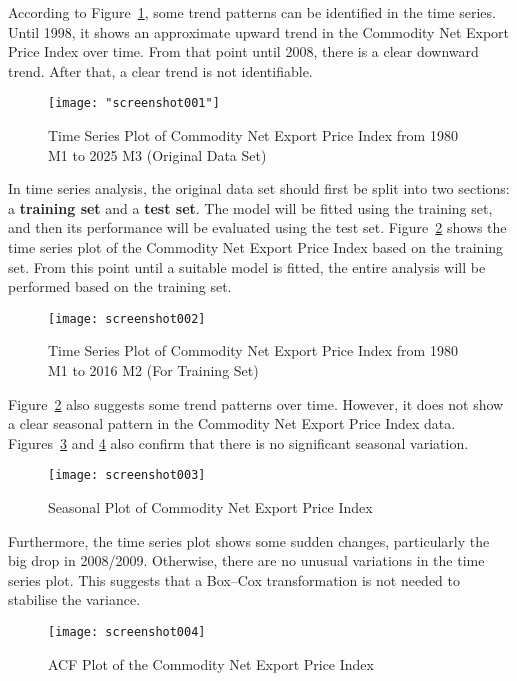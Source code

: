 \documentclass[12pt,a4paper]{report} %
\begin{document}
	According to Figure~\ref{fig:screenshot001}, some trend patterns can be identified in the time series. Until 1998, it shows an approximate upward trend in the Commodity Net Export Price Index over time. From that point until 2008, there is a clear downward trend. After that, a clear trend is not identifiable.
	
	
	\begin{figure}[h!]
		\centering
		\texttt{[image: "screenshot001"]}
		\caption{Time Series Plot of Commodity Net Export Price Index from 1980 M1 to 2025 M3 (Original Data Set)}
		\label{fig:screenshot001}
	\end{figure}
	
	
	In time series analysis, the original data set should first be split into two sections: a \textbf{training set} and a \textbf{test set}. The model will be fitted using the training set, and then its performance will be evaluated using the test set. Figure~\ref{fig:screenshot002} shows the time series plot of the Commodity Net Export Price Index based on the training set. From this point until a suitable model is fitted, the entire analysis will be performed based on the training set.
	
	
	\begin{figure}[h!]
		\centering
		\texttt{[image: screenshot002]}
		\caption{Time Series Plot of Commodity Net Export Price Index from 1980 M1 to 2016 M2 (For Training Set)}
		\label{fig:screenshot002}
	\end{figure}
	
	
	Figure~\ref{fig:screenshot002} also suggests some trend patterns over time. However, it does not show a clear seasonal pattern in the Commodity Net Export Price Index data. Figures~\ref{fig:screenshot003} and \ref{fig:screenshot004} also confirm that there is no significant seasonal variation.
	
	
	\begin{figure}[h!]
		\centering
		\texttt{[image: screenshot003]}
		\caption{Seasonal Plot of Commodity Net Export Price Index}
		\label{fig:screenshot003}
	\end{figure}
	
	
	Furthermore, the time series plot shows some sudden changes, particularly the big drop in 2008/2009. Otherwise, there are no unusual variations in the time series plot. This suggests that a Box–Cox transformation is not needed to stabilise the variance.
	
	
	\begin{figure}[h!]
		\centering
		\texttt{[image: screenshot004]}
		\caption{ACF Plot of the Commodity Net Export Price Index}
		\label{fig:screenshot004}
	\end{figure}
	
\end{document}
